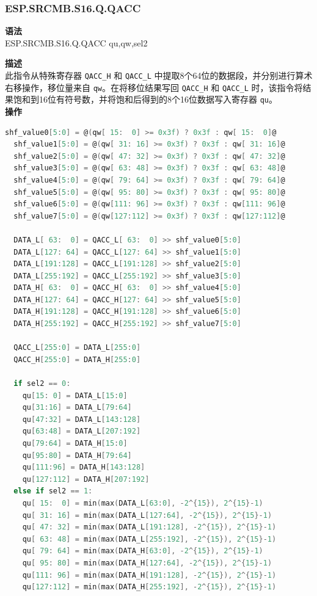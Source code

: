 \newpage
\subsubsection{ESP.SRCMB.S16.Q.QACC}\label{instruction:ESPSRCMBS16QQACC}
\textbf{语法}\\
ESP.SRCMB.S16.Q.QACC qu,qw,sel2

\textbf{描述}\\
此指令从特殊寄存器 \lstinline{QACC_H} 和 \lstinline{QACC_L} 中提取8个64位的数据段，并分别进行算术右移操作，移位量来自 \lstinline{qw}。在将移位结果写回 \lstinline{QACC_H} 和 \lstinline{QACC_L} 时，该指令将结果饱和到16位有符号数，并将饱和后得到的8个16位数据写入寄存器 \lstinline{qu}。\\
\textbf{操作}
\begin{lstlisting}[language=C, escapechar=@]
  shf_value0[5:0] = @(qw[ 15:  0] >= 0x3f) ? 0x3f : qw[ 15:  0]@
  shf_value1[5:0] = @(qw[ 31: 16] >= 0x3f) ? 0x3f : qw[ 31: 16]@
  shf_value2[5:0] = @(qw[ 47: 32] >= 0x3f) ? 0x3f : qw[ 47: 32]@
  shf_value3[5:0] = @(qw[ 63: 48] >= 0x3f) ? 0x3f : qw[ 63: 48]@
  shf_value4[5:0] = @(qw[ 79: 64] >= 0x3f) ? 0x3f : qw[ 79: 64]@
  shf_value5[5:0] = @(qw[ 95: 80] >= 0x3f) ? 0x3f : qw[ 95: 80]@
  shf_value6[5:0] = @(qw[111: 96] >= 0x3f) ? 0x3f : qw[111: 96]@
  shf_value7[5:0] = @(qw[127:112] >= 0x3f) ? 0x3f : qw[127:112]@

  DATA_L[ 63:  0] = QACC_L[ 63:  0] >> shf_value0[5:0]
  DATA_L[127: 64] = QACC_L[127: 64] >> shf_value1[5:0]
  DATA_L[191:128] = QACC_L[191:128] >> shf_value2[5:0]
  DATA_L[255:192] = QACC_L[255:192] >> shf_value3[5:0]
  DATA_H[ 63:  0] = QACC_H[ 63:  0] >> shf_value4[5:0]
  DATA_H[127: 64] = QACC_H[127: 64] >> shf_value5[5:0]
  DATA_H[191:128] = QACC_H[191:128] >> shf_value6[5:0]
  DATA_H[255:192] = QACC_H[255:192] >> shf_value7[5:0]

  QACC_L[255:0] = DATA_L[255:0]
  QACC_H[255:0] = DATA_H[255:0]

  if sel2 == 0:
    qu[15: 0] = DATA_L[15:0]
    qu[31:16] = DATA_L[79:64]
    qu[47:32] = DATA_L[143:128]
    qu[63:48] = DATA_L[207:192]
    qu[79:64] = DATA_H[15:0]
    qu[95:80] = DATA_H[79:64]
    qu[111:96] = DATA_H[143:128]
    qu[127:112] = DATA_H[207:192]
  else if sel2 == 1:
    qu[ 15:  0] = min(max(DATA_L[63:0], -2^{15}), 2^{15}-1)
    qu[ 31: 16] = min(max(DATA_L[127:64], -2^{15}), 2^{15}-1)
    qu[ 47: 32] = min(max(DATA_L[191:128], -2^{15}), 2^{15}-1)
    qu[ 63: 48] = min(max(DATA_L[255:192], -2^{15}), 2^{15}-1)
    qu[ 79: 64] = min(max(DATA_H[63:0], -2^{15}), 2^{15}-1)
    qu[ 95: 80] = min(max(DATA_H[127:64], -2^{15}), 2^{15}-1)
    qu[111: 96] = min(max(DATA_H[191:128], -2^{15}), 2^{15}-1)
    qu[127:112] = min(max(DATA_H[255:192], -2^{15}), 2^{15}-1)
\end{lstlisting}

